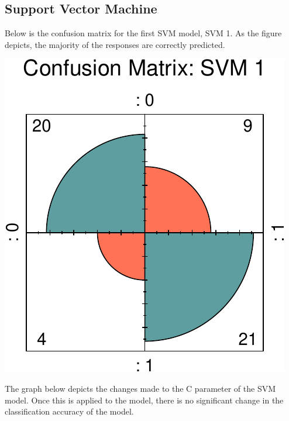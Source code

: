 \documentclass[11pt,preprint, authoryear]{elsarticle}
\numberwithin{equation}{section}
\numberwithin{figure}{section}
\numberwithin{table}{section}
\begin{document}
\hypertarget{support-vector-machine-1}{%
\subsection{Support Vector Machine}\label{support-vector-machine-1}}

Below is the confusion matrix for the first SVM model, SVM 1. As the
figure depicts, the majority of the responses are correctly predicted.

\begin{center}\includegraphics{ML_project_files/figure-latex/unnamed-chunk-19-1} \end{center}

The graph below depicts the changes made to the C parameter of the SVM
model. Once this is applied to the model, there is no significant change
in the classification accuracy of the model.
\end{document}
